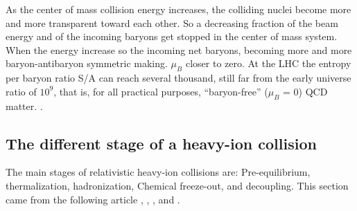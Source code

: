 \documentclass[12pt,a4paper]{book}
\begin{document}
	  As the center of mass collision energy increases, the colliding nuclei become more and	more transparent toward each other. So a decreasing fraction of the beam energy and of the incoming baryons get stopped in the center of mass system. When the energy increase so the incoming net baryons, becoming more and more baryon-antibaryon symmetric making. $\mu_B$ closer to zero. At the LHC the entropy per baryon ratio S/A can reach several thousand, still far from the early universe ratio of $10^9$, that is, for all practical purposes, “baryon-free” ($\mu_B$ = 0) QCD matter.
	 \cite{heinz2004conceptsheavyionphysics}.
	
	\subsection{The different stage of a heavy-ion collision}
	The main stages of relativistic heavy-ion collisions are: Pre-equilibrium, thermalization, hadronization, Chemical freeze-out, and	decoupling. This section came from the following article \cite{heinz2004conceptsheavyionphysics}, \cite{Herrmann:2920632}, \cite{Padhan:2924203}, \cite{Arata:2922803} and \cite{amsdottorato9036}.
\end{document}
